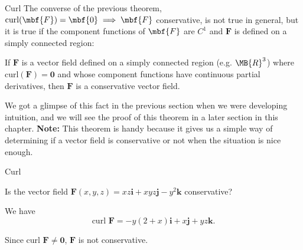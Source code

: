 \documentclass[11pt,english,
handout
]{beamer}
\begin{document}
\begin{frame}[t]{Curl}
\small
The converse of the previous theorem, $\text{curl}(\mbf{F})=\mbf{0} \implies \mbf{F}$ conservative, is not true in general, but it is true if the component functions of $\mbf{F}$ are $C^1$ and $\mathbf{F}$ is defined on a simply connected region:\pause 

\lspace
\begin{theorem}
If $\mathbf{F}$ is a vector field defined on a simply connected region (e.g. $\MB{R}^3$) where $\text{curl}(\mathbf{F})=\mathbf{0}$ and whose component functions have continuous partial derivatives, then $\mathbf{F}$ is a conservative vector field.
\end{theorem}\pause

\lspace
We got a glimpse of this fact in the previous section when we were developing intuition, and we will see the proof of this theorem in a later section in this chapter. \pause \textbf{Note:} This theorem is handy because it gives us a simple way of determining if a vector field is conservative or not when the situation is nice enough.
\end{frame}













\begin{frame}[t]{Curl}
\begin{example}
Is the vector field $\mathbf{F}(x,y,z)=xz\mathbf{i}+xyz\mathbf{j}-y^2\mathbf{k}$ conservative?\pause

\lspace
We have
\[
\text{curl }\mathbf{F}=-y(2+x)\mathbf{i}+x\mathbf{j}+yz\mathbf{k}.
\]\pause 

Since curl $\mathbf{F}\neq\mathbf{0}$, $\mathbf{F}$ is not conservative.
\end{example}
\end{frame}
\end{document}
